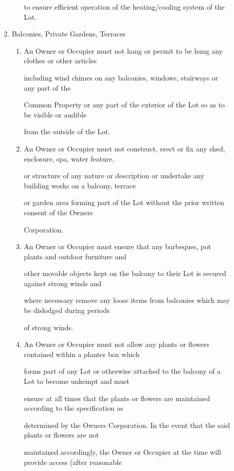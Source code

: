\documentclass{article}
\begin{document}
\begin{enumerate}[label=\arabic*.]
\begin{enumerate}[label=\arabic{enumi}.\arabic*.]
\begin{enumerate}[label=(\arabic*)]
\begin{enumerate}[label=(\alph*)]
to ensure efficient operation of the heating/cooling system of the Lot. 

\end{enumerate}
\item  Balconies, Private Gardens, Terraces 

\begin{enumerate}[label=(\alph*)]
\item  An Owner or Occupier must not hang or permit to be hung any clothes or other articles 

including wind chimes on any balconies, windows, stairways or any part of the  

Common Property or any part of the exterior of the Lot so as to be visible or audible 

from the outside of the Lot. 

\item  An Owner or Occupier must not construct, erect or fix any shed, enclosure, spa, water feature, 

or structure of any nature or description or undertake any building works on a balcony, terrace 

or garden area forming part of the Lot without the prior written consent of the Owners 

Corporation. 

\item  An Owner or Occupier must ensure that any barbeques, pot plants and outdoor furniture and 

other movable objects kept on the balcony to their Lot is secured against strong winds and 

where necessary remove any loose items from balconies which may be dislodged during periods 

of strong winds. 

\item  An Owner or Occupier must not allow any plants or flowers contained within a planter box which 

forms part of any Lot or otherwise attached to the balcony of a Lot to become unkempt and must 

ensure at all times that the plants or flowers are maintained according to the specification as 

determined by the Owners Corporation. In the event that the said plants or flowers are not 

maintained accordingly, the Owner or Occupier at the time will provide access (after reasonable 


\end{enumerate}
\end{enumerate}
\end{enumerate}
\end{enumerate}
\end{document}

